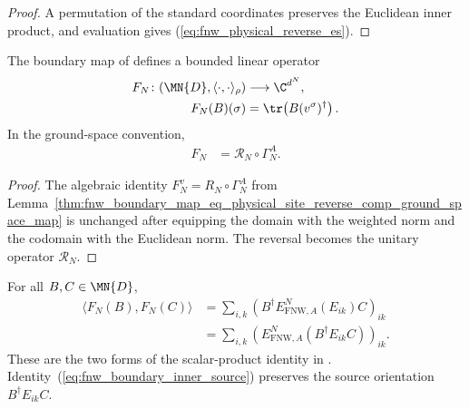 \begin{proof}
    \leanok
    A permutation of the standard coordinates preserves the Euclidean inner
    product, and evaluation gives
    (\ref{eq:fnw_physical_reverse_es}).
\end{proof}

\begin{definition}
    \label{def:fnw_boundary_clm}
    \leanok
    The boundary map of \cite[Equation~(5.5)]{Fannes1992Finitely} defines a
    bounded linear operator
    \begin{align}
        F_N\colon(\MN{D},\langle\cdot,\cdot\rangle_\rho)
         & \longrightarrow\C^{d^N},                \\
        F_N(B)(\sigma)
         & =\tr\!\left(B(v^\sigma)^\dagger\right).
        \label{eq:fnw_boundary_clm_apply}
    \end{align}
    In the ground-space convention,
    \begin{align}
        F_N & =\mathcal R_N\circ\Gamma_N^A.
        \label{eq:fnw_boundary_clm_ground_space}
    \end{align}
\end{definition}

\begin{proof}
    \leanok
    The algebraic identity
    $F_N^v=R_N\circ\Gamma_N^A$ from
    Lemma~\ref{thm:fnw_boundary_map_eq_physical_site_reverse_comp_ground_space_map}
    is unchanged after equipping the domain with the weighted norm and the
    codomain with the Euclidean norm. The reversal becomes the unitary
    operator $\mathcal R_N$.
\end{proof}

\begin{lemma}
    \label{thm:fnw_boundary_inner}
    \leanok
    For all $B,C\in\MN{D}$,
    \begin{align}
        \langle F_N(B),F_N(C)\rangle
         & =\sum_{i,k}
        \left(B^\dagger E_{\mathrm{FNW},A}^N(E_{ik})C\right)_{ik}
        \label{eq:fnw_boundary_inner_choi} \\
         & =\sum_{i,k}
        \left(E_{\mathrm{FNW},A}^N
        \left(B^\dagger E_{ik}C\right)\right)_{ik}.
        \label{eq:fnw_boundary_inner_source}
    \end{align}
    These are the two forms of the scalar-product identity in
    \cite[Equation~(5.8)]{Fannes1992Finitely}. Identity~(\ref{eq:fnw_boundary_inner_source}) preserves
    the source orientation $B^\dagger E_{ik}C$.
\end{lemma}

